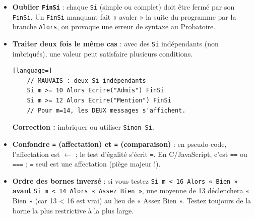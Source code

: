\documentclass[11pt]{article}
\begin{document}
\begin{attention}
\begin{itemize}
    \item \textbf{Oublier \texttt{FinSi}} : chaque \texttt{Si} (simple ou complet) doit être fermé par son \texttt{FinSi}. Un \texttt{FinSi} manquant fait « avaler » la suite du programme par la branche \texttt{Alors}, ou provoque une erreur de syntaxe au Probatoire.
    \item \textbf{Traiter deux fois le même cas} : avec des \texttt{Si} indépendants (non imbriqués), une valeur peut satisfaire plusieurs conditions.
    \begin{lstlisting}[language=]
    // MAUVAIS : deux Si indépendants
    Si m >= 10 Alors Ecrire("Admis") FinSi
    Si m >= 12 Alors Ecrire("Mention") FinSi
    // Pour m=14, les DEUX messages s'affichent.
    \end{lstlisting}
    \textbf{Correction :} imbriquer ou utiliser \texttt{Sinon Si}.
    \item \textbf{Confondre \texttt{=} (affectation) et \texttt{=} (comparaison)} : en pseudo-code, l'affectation est \texttt{$\leftarrow$} ; le test d'égalité s'écrit \texttt{=}. En C/JavaScript, c'est \texttt{==} ou \texttt{===} ; \texttt{=} seul est une affectation (piège majeur !).
    \item \textbf{Ordre des bornes inversé} : si vous testez \texttt{Si m < 16 Alors « Bien »} \textbf{avant} \texttt{Si m < 14 Alors « Assez Bien »}, une moyenne de 13 déclenchera « Bien » (car 13 < 16 est vrai) au lieu de « Assez Bien ». Testez toujours de la borne la plus restrictive à la plus large.
\end{itemize}
\end{attention}
\end{document}

